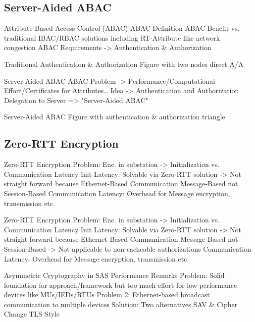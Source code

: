 \documentclass[en]{sdqbeamer}
\begin{document}
\subsection{Server-Aided ABAC}
\begin{frame}{Attribute-Based Access Control (ABAC)}
    ABAC Definition
    ABAC Benefit vs. traditional IBAC/RBAC solutions including RT-Attribute like network congestion
    ABAC Requirements -> Authentication \& Authorization
\end{frame}

\begin{frame}{Traditional Authentication \& Authorization}
    Figure with two nodes direct A/A
\end{frame}

\begin{frame}{Server-Aided ABAC}
    ABAC Problem -> Performance/Computational Effort/Certificates for Attributes\dots
    Idea -> Authentication and Authorization Delegation to Server => "Server-Aided ABAC"
\end{frame}

\begin{frame}{Server-Aided ABAC}
    Figure with authentication \& authorization triangle 
\end{frame}

\subsection{Zero-RTT Encryption}
\begin{frame}{Zero-RTT Encryption}
    Problem: Enc. in substation -> Initialization vs. Communication Latency
    Init Latency: Solvable via Zero-RTT solution -> Not straight forward because Ethernet-Based Communication Message-Based not Session-Based
    Communication Latency: Overhead for Message encryption, transmission etc.
\end{frame}

\begin{frame}{Zero-RTT Encryption}
    Problem: Enc. in substation -> Initialization vs. Communication Latency
    Init Latency: Solvable via Zero-RTT solution -> Not straight forward because Ethernet-Based Communication Message-Based not Session-Based
    -> Not applicable to non-cacheable authorizations
    Communication Latency: Overhead for Message encryption, transmission etc.
\end{frame}

\begin{frame}{Asymmetric Cryptography in SAS}
    Performance Remarks
    Problem: Solid foundation for approach/framework but too much effort for low performance devices like MUs/IEDs/RTUs
    Problem 2: Ethernet-based broadcast communication to multiple devices
    Solution: Two alternatives SAV \& Cipher Change TLS Style
\end{frame}
\end{document}
